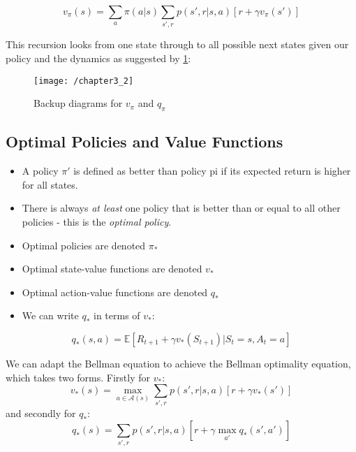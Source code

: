 \begin{equation}
v_\pi(s) = \sum_{a} \pi(a|s) \sum_{s',r} p(s', r | s, a) \left[r + \gamma v_\pi(s')\right]
\end{equation}

This recursion looks from one state through to all possible next states given our policy and the dynamics as suggested by \ref{fig:backup}:
\begin{figure}[h!]
	\centering
	\texttt{[image: /chapter3\_2]}
	\caption{Backup diagrams for \(v_\pi\) and \(q_\pi\)}
	\label{fig:backup}
\end{figure}

\subsection{Optimal Policies and Value Functions}
\begin{itemize}
\item A policy \(\pi '\) is defined as better than policy pi if its expected return is higher for all states.
\item There is always \textit{at least} one policy that is better than or equal to all other policies - this is the \textit{optimal policy}.
\item Optimal policies are denoted \(\pi_*\)
\item Optimal state-value functions are denoted \(v_*\)
\item Optimal action-value functions are denoted \(q_*\)
\item We can write \(q_*\) in terms of \(v_*\):
\end{itemize}

\begin{equation}
q_*(s,a) = \mathbb{E} \left[R_{t+1} + \gamma v_*(S_{t+1}) | S_t = s, A_t = a \right]
\end{equation}

We can adapt the Bellman equation to achieve the Bellman optimality equation, which takes two forms. Firstly for \(v_*\):
\begin{equation}
v_*(s) = \max_{a \in \mathcal{A}(s)} \sum_{s',r} p(s', r | s, a) \left[r + \gamma v_*(s')\right]
\end{equation}
and secondly for \(q_*\):
\begin{equation}
q_*(s) = \sum_{s',r} p(s', r | s, a) \left[r + \gamma \max_{a'} q_*(s', a') \right]
\end{equation}

